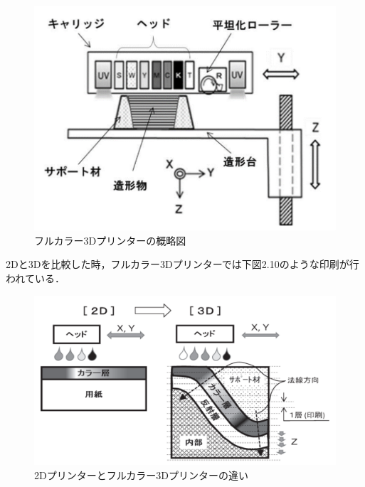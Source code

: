 \begin{figure}[H]
  \centering
  \includegraphics[width=11truecm]{./fig/hurukara.png}
  \caption{フルカラー3Dプリンターの概略図}
  \label{fig:ferret}
\end{figure}

2Dと3Dを比較した時，フルカラー3Dプリンターでは下図2.10のような印刷が行われている．

\begin{figure}[H]
  \centering
  \includegraphics[width=11truecm]{./fig/hurukara2.png}
  \caption{2Dプリンターとフルカラー3Dプリンターの違い}
  \label{fig:ferret}
\end{figure}

